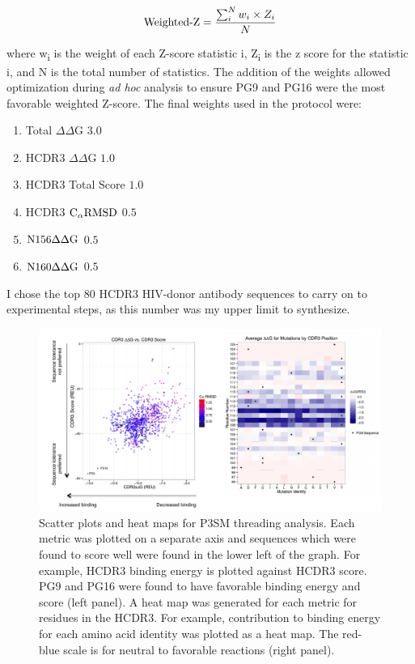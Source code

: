 \begin{gather*}
\textup{Weighted-Z} = \frac{\sum_{i}^{N}w_{i}\times Z_{i}}{N}
\end{gather*}

\noindent where w\textsubscript{i} is the weight of each Z-score statistic i, Z\textsubscript{i} is the z score for the statistic i, and N is the total number of statistics. The addition of the weights allowed optimization during \textit{ad hoc} analysis to ensure PG9 and PG16 were the most favorable weighted Z-score. The final weights used in the protocol were:
\begin{enumerate}
\setlength{\itemsep}{0pt}
\setlength{\parskip}{0pt}
\setlength{\parsep}{0pt}
\item Total $\Delta\Delta$G \textemdash{}  $3.0$
\item HCDR3 $\Delta\Delta$G \textemdash{}  $1.0$
\item HCDR3 Total Score \textemdash{}  $1.0$
\item HCDR3 $\textup{C}_{\alpha} \textup{RMSD}$ \textemdash{}  $0.5$
\item $\textup{N156} \Delta \Delta \textup{G}$ \textemdash{}  $0.5$
\item $\textup{N160} \Delta \Delta \textup{G}$ \textemdash{}  $0.5$
\end{enumerate}

\noindent I chose the top 80 HCDR3 HIV-\naive donor antibody sequences to carry on to experimental steps, as this number was my upper limit to synthesize.

\begin{figure}
   \centering
   \includegraphics[width=\linewidth]{images/chapter3/figure3_11.pdf} %
   \caption[Scatter Plots and Heat Maps for P3SM Threading Analysis]{Scatter plots and heat maps for P3SM threading analysis. Each metric was plotted on a separate axis and sequences which were found to score well were found in the lower left of the graph. For example, HCDR3 binding energy is plotted against HCDR3 score. PG9 and PG16 were found to have favorable binding energy and score (left panel). A heat map was generated for each metric for residues in the HCDR3. For example, contribution to binding energy for each amino acid identity was plotted as a heat map. The red-blue scale is for neutral to favorable reactions (right panel).}
   \label{fig:figure3_11}
\end{figure}

